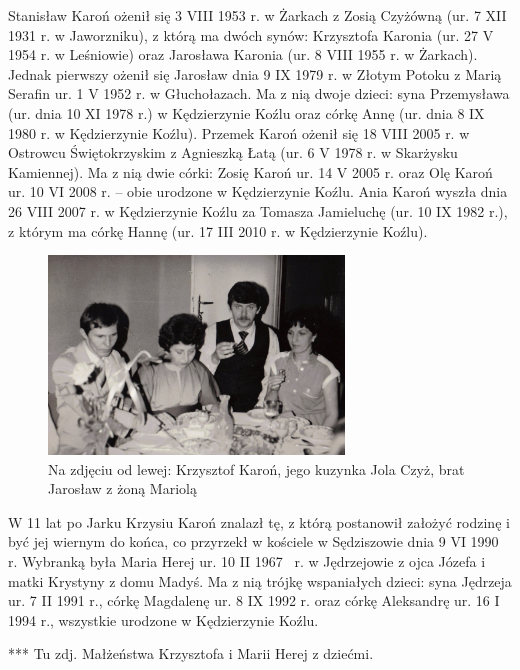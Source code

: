 Stanisław Karoń ożenił się 3 VIII 1953 r. w Żarkach z Zosią Czyżówną (ur. 7 XII 1931 r. w Jaworzniku), z którą ma dwóch synów: Krzysztofa Karonia (ur. 27 V 1954 r. w Leśniowie) oraz Jarosława Karonia (ur. 8 VIII 1955 r. w Żarkach). Jednak pierwszy ożenił się Jarosław dnia 9 IX 1979 r. w Złotym Potoku z Marią Serafin ur. 1 V 1952 r. w Głuchołazach. Ma z nią dwoje dzieci: syna Przemysława (ur. dnia 10 XI 1978 r.) w Kędzierzynie Koźlu oraz córkę Annę (ur. dnia 8 IX 1980 r. w Kędzierzynie Koźlu). Przemek Karoń ożenił się 18 VIII 2005 r. w Ostrowcu Świętokrzyskim z Agnieszką Łatą (ur. 6 V 1978 r. w Skarżysku Kamiennej). Ma z nią dwie córki: Zosię Karoń ur. 14 V 2005 r. oraz Olę Karoń ur. 10 VI 2008 r. -- obie urodzone w Kędzierzynie Koźlu. Ania Karoń wyszła dnia 26 VIII 2007 r. w Kędzierzynie Koźlu za Tomasza Jamieluchę (ur. 10 IX 1982 r.), z którym ma córkę Hannę (ur. 17 III 2010 r. w Kędzierzynie Koźlu).

\begin{figure}[!h]
\begin{center}
\includegraphics[width=0.7\textwidth]{zdjecia/krzysztof_karon_jarek_karon_z_zona.jpg}
\caption[Krzysztof, Jarosław i Mariola Karoniowie]{Na zdjęciu od lewej: Krzysztof Karoń, jego kuzynka Jola Czyż, brat Jarosław z żoną Mariolą}
\label{rys:krzysztof_karon_jarek_karon_z_zona.jpg}
\end{center}
\end{figure}

W 11 lat po Jarku Krzysiu Karoń znalazł tę, z którą postanowił założyć rodzinę i być jej wiernym do końca, co przyrzekł w kościele w Sędziszowie dnia 9 VI 1990 r. Wybranką była Maria Herej ur. 10 II 1967~ r. w Jędrzejowie z ojca Józefa i matki Krystyny z domu Madyś. Ma z nią trójkę wspaniałych dzieci: syna Jędrzeja ur. 7 II 1991 r., córkę Magdalenę ur. 8 IX 1992 r. oraz córkę Aleksandrę ur. 16 I 1994 r., wszystkie urodzone w Kędzierzynie Koźlu.


{\color{red}
*** Tu zdj. Małżeństwa Krzysztofa i Marii Herej z dziećmi.}